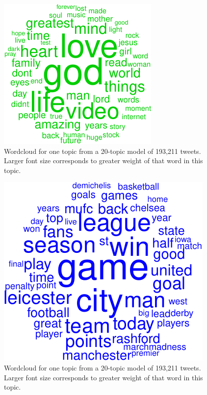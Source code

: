 \documentclass[12pt,]{article}
\begin{document}
\begin{figure}
\includegraphics[width=\textwidth]{lda-tutorial-2016_files/figure-latex/tw-wordcloud1-2.pdf}
\caption{Wordcloud for one topic from a 20-topic model of 193,211 tweets. Larger font size corresponds to greater weight of that word in this topic.\label{fig:twc2}}
\end{figure}

\begin{figure}
\includegraphics[width=\textwidth]{lda-tutorial-2016_files/figure-latex/tw-wordcloud1-3.pdf}
\caption{Wordcloud for one topic from a 20-topic model of 193,211 tweets. Larger font size corresponds to greater weight of that word in this topic.\label{fig:twc3}}
\end{figure}
\end{document}
